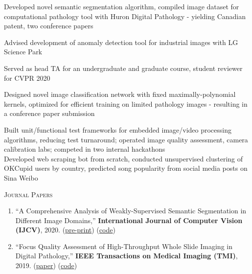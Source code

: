 \documentclass[letterpaper, 12pt]{cv_style}
\begin{document}
\begin{ditem}
	\item Developed novel semantic segmentation algorithm, compiled image dataset for computational pathology tool with Huron Digital Pathology - yielding Canadian patent, two conference papers
	\item Advised development of anomaly detection tool for industrial images with LG Science Park\\
	\item Served as head TA for an undergraduate and graduate course, student reviewer for CVPR 2020\\
\end{ditem}
%
\medspace
Designed novel image classification network with fixed maximally-polynomial kernels, optimized for efficient training on limited pathology images - resulting in a conference paper submission\\
\medspace
%

\medspace
Built unit/functional test frameworks for embedded image/video processing algorithms, reducing test turnaround; operated image quality assessment, camera calibration labs; competed in two internal hackathons\\
\medspace
%
\medspace
Developed web scraping bot from scratch, conducted unsupervised clustering of OKCupid users by country, predicted song popularity from social media posts on Sina Weibo\\
\medspace

\textsc{Journal Papers}
\begin{enumerate}
	\item ``A Comprehensive Analysis of Weakly-Supervised Semantic Segmentation in Different Image Domains,'' \textbf{International Journal of Computer Vision (IJCV)}, 2020. (\href{https://arxiv.org/pdf/1912.11186.pdf}{pre-print}) (\href{https://github.com/lyndonchan/wsss-analysis}{code})
	\item ``Focus Quality Assessment of High-Throughput Whole Slide Imaging in Digital Pathology,'' \textbf{IEEE Transactions on Medical Imaging (TMI)}, 2019. (\href{https://ieeexplore.ieee.org/abstract/document/8725582}{paper}) (\href{https://github.com/mahdihosseini/FQPath}{code})
\end{enumerate}
\end{document}
